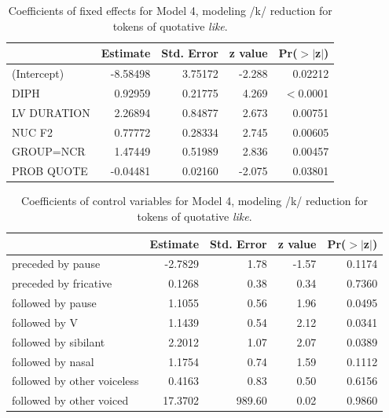    \begin{table}[ht]
\begin{center}
\begin{tabular}{lrrrr}
  \hline
 & Estimate & Std. Error & z value & Pr($>$$|$z$|$)  \\
  \hline
  
(Intercept)    &  -8.58498  &  3.75172  & -2.288  & 0.02212 \\
DIPH           &  0.92959  &  0.21775  & 4.269 & $<$0.0001 \\  
LV DURATION &  2.26894  &  0.84877  & 2.673  & 0.00751 \\
NUC F2   & 0.77772   & 0.28334  &  2.745 & 0.00605 \\
GROUP=NCR           &  1.47449  &  0.51989  & 2.836 & 0.00457  \\
PROB QUOTE          &  -0.04481  &  0.02160 & -2.075  & 0.03801  \\

   \hline
\end{tabular}
\caption{Coefficients of fixed effects for Model 4, modeling /k/ reduction for tokens of quotative \textit{like}.}
\label{model4coeff}
\end{center}
\end{table}

   
         


\begin{table}[ht]
\begin{center}
\begin{tabular}{lrrrr}
  \hline
 & Estimate & Std. Error & z value & Pr($>$$|$z$|$)  \\
  \hline
preceded by pause    &  -2.7829 &   1.78  & -1.57  & 0.1174 \\
preceded by fricative 	& 0.1268  &  0.38 &  0.34 & 0.7360 \\
followed by pause  &  1.1055  &  0.56  & 1.96 & 0.0495 \\
followed by V   &   1.1439 &   0.54 &  2.12 & 0.0341 \\
followed by sibilant & 2.2012  &  1.07 &  2.07 & 0.0389 \\
followed by nasal &  1.1754  &  0.74  & 1.59 & 0.1112 \\
followed by other voiceless & 0.4163 &   0.83 &  0.50 & 0.6156 \\
followed by other voiced  &  17.3702 & 989.60 &  0.02 & 0.9860 \\ 
   \hline
\end{tabular}
\caption{Coefficients of control variables for Model 4, modeling /k/ reduction for tokens of quotative \textit{like}.}
\label{model4coeff-control}
\end{center}
\end{table}

